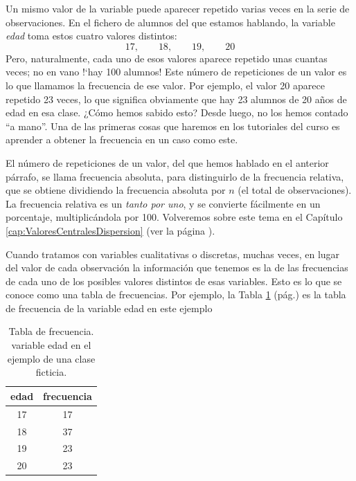 Un mismo valor de la variable puede aparecer repetido varias veces en
la serie de observaciones. En el fichero de alumnos del que estamos
hablando, la variable {\em edad} toma estos cuatro valores distintos:
\[17,\qquad  18,\qquad 19,\qquad 20\]
Pero, naturalmente, cada uno de esos valores aparece repetido unas cuantas veces; no en vano {!`}hay 100 alumnos! Este {\sf número de repeticiones de un
valor} es lo que llamamos la {\sf frecuencia}  de ese valor. Por ejemplo, el valor 20 aparece repetido 23 veces, lo que significa
obviamente que hay 23 alumnos de 20 años de edad en esa clase. ¿Cómo hemos sabido esto? Desde luego, no los hemos contado ``a mano''. Una de las
primeras cosas que haremos en los tutoriales del curso es aprender a obtener la frecuencia en un caso como este.



El número de repeticiones de un valor, del que hemos hablado en el anterior párrafo, se llama {\sf frecuencia absoluta}, para distinguirlo de la {\sf frecuencia relativa}, que se obtiene dividiendo la frecuencia absoluta por $n$ (el
total de observaciones). La frecuencia relativa es un {\em tanto por uno}, y se convierte fácilmente en un {\sf porcentaje}, multiplicándola por 100. Volveremos sobre este tema en el Capítulo \ref{cap:ValoresCentralesDispersion} (ver la página \pageref{cap02:subsubsec:MedianaTablasFrecuenciasRelativasAcumuladas}).


Cuando tratamos con variables cualitativas o discretas, muchas veces, en lugar del valor de cada observación la información que tenemos es la
de las frecuencias de cada uno de los posibles valores distintos de esas variables. Esto es lo que se conoce como una {\sf tabla de
frecuencias}. Por ejemplo, la Tabla \ref{cap01:tabla:FrecuenciaEdadClase} (pág.\pageref{cap01:tabla:FrecuenciaEdadClase})
es la tabla de frecuencia de la variable edad en este ejemplo

\begin{table}[ht]
\centering
\begin{tabular}{cc}
  \hline
  edad& frecuencia \\
  \hline
  17 &  17 \\
  18 &  37 \\
  19 &  23 \\
  20 &  23 \\
   \hline
\end{tabular}
\caption{Tabla de frecuencia. variable edad en el ejemplo de una clase ficticia.}
\label{cap01:tabla:FrecuenciaEdadClase}
\end{table}

